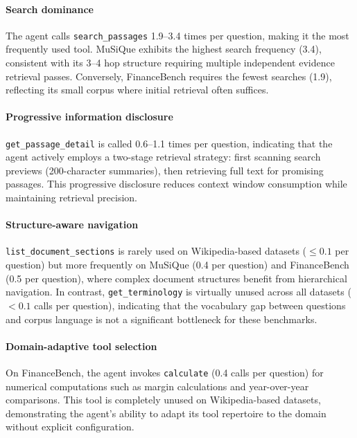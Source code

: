\paragraph{Search dominance}
The agent calls \texttt{search\_passages} 1.9--3.4 times per question, making it the most frequently used tool.
MuSiQue exhibits the highest search frequency (3.4), consistent with its 3--4 hop structure requiring multiple independent evidence retrieval passes.
Conversely, FinanceBench requires the fewest searches (1.9), reflecting its small corpus where initial retrieval often suffices.

\paragraph{Progressive information disclosure}
\texttt{get\_passage\_detail} is called 0.6--1.1 times per question, indicating that the agent actively employs a two-stage retrieval strategy: first scanning search previews (200-character summaries), then retrieving full text for promising passages.
This progressive disclosure reduces context window consumption while maintaining retrieval precision.

\paragraph{Structure-aware navigation}
\texttt{list\_document\_sections} is rarely used on Wikipedia-based datasets ($\leq 0.1$ per question) but more frequently on MuSiQue (0.4 per question) and FinanceBench (0.5 per question), where complex document structures benefit from hierarchical navigation.
In contrast, \texttt{get\_terminology} is virtually unused across all datasets ($< 0.1$ calls per question), indicating that the vocabulary gap between questions and corpus language is not a significant bottleneck for these benchmarks.

\paragraph{Domain-adaptive tool selection}
On FinanceBench, the agent invokes \texttt{calculate} (0.4 calls per question) for numerical computations such as margin calculations and year-over-year comparisons.
This tool is completely unused on Wikipedia-based datasets, demonstrating the agent's ability to adapt its tool repertoire to the domain without explicit configuration.

